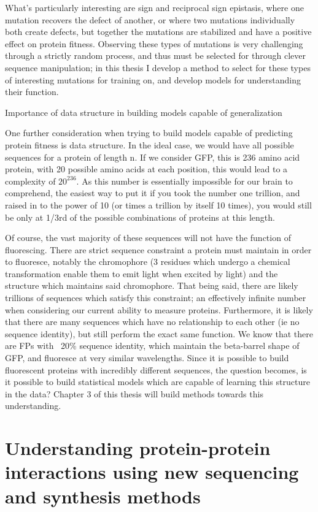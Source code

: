 What’s particularly interesting are sign and reciprocal sign epistasis, where one mutation recovers the defect of another, or where two mutations individually both create defects, but together the mutations are stabilized and have a positive effect on protein fitness. Observing these types of mutations is very challenging through a strictly random process, and thus must be selected for through clever sequence manipulation; in this thesis I develop a method to select for these types of interesting mutations for training on, and develop models for understanding their function. 

Importance of data structure in building models capable of generalization 

One further consideration when trying to build models capable of predicting protein fitness is data structure. In the ideal case, we would have all possible sequences for a protein of length n. If we consider GFP, this is 236 amino acid protein, with 20 possible amino acids at each position, this would lead to a complexity of \( 20^{236}\). As this number is essentially impossible for our brain to comprehend, the easiest way to put it if you took the number one trillion, and raised in to the power of 10 (or times a trillion by itself 10 times), you would still be only at 1/3rd of the possible combinations of proteins at this length. 

Of course, the vast majority of these sequences will not have the function of fluorescing. There are strict sequence constraint a protein must maintain in order to fluoresce, notably the chromophore (3 residues which undergo a chemical transformation enable them to emit light when excited by light) and the structure which maintains said chromophore. That being said, there are likely trillions of sequences which satisfy this constraint; an effectively infinite number  when considering our current ability to measure proteins. Furthermore, it is likely that there are many sequences which have no relationship to each other (ie no sequence identity), but still perform the exact same function. We know that there are FPs with ~20\% sequence identity, which maintain the beta-barrel shape of GFP, and fluoresce at very similar wavelengths. Since it is possible to build fluorescent proteins with incredibly different sequences, the question becomes, is it possible to build statistical models which are capable of learning this structure in the data? Chapter 3 of this thesis will build methods towards this understanding. 

\section{Understanding protein-protein interactions using new sequencing and synthesis methods}

